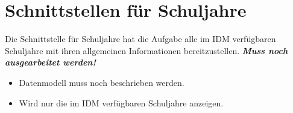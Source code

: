 \section{Schnittstellen für Schuljahre}
Die Schnittstelle für Schuljahre hat die Aufgabe alle im IDM verfügbaren Schuljahre mit ihren allgemeinen Informationen bereitzustellen.
\textbf{\emph{\textcolor[rgb]{1,0,0}{Muss noch ausgearbeitet werden!}}}
\begin{itemize}
	\item Datenmodell muss noch beschrieben werden.
	\item Wird nur die im IDM verfügbaren Schuljahre anzeigen.
\end{itemize}


